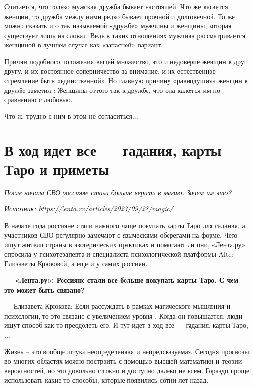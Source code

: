 Считается, что только мужская дружба бывает настоящей. Что же касается женщин, то дружба между ними редко бывает прочной и долговечной. То же можно сказать и о так называемой «дружбе» мужчины и женщины, которая существует лишь на словах. Ведь в таких отношениях мужчина рассматривается женщиной в лучшем случае как «запасной» вариант.

Причин подобного положения вещей множество, это и недоверие женщин к друг другу, и их постоянное соперничество за внимание, и их естественное стремление быть «единственной». Но главную причину «равнодушия» женщин к дружбе заметил : Женщины оттого так  к дружбе, что она кажется им  по сравнению с любовью.

Что ж, трудно с ним в этом не согласиться...

\newpage
\section{В ход идет все — гадания, карты Таро и приметы}

\textit{После начала СВО россияне стали больше верить в магию. Зачем им это?}

\textit{Источник: \url{https://lenta.ru/articles/2023/09/28/magia/}}

В начале года россияне стали намного чаще покупать карты Таро для гадания, а участников СВО регулярно замечают с языческими оберегами на форме. Чего ищут жители страны в эзотерических практиках и помогают ли они, «Лента.ру» спросила у психотерапевта и специалиста психологической платформы Alter Елизаветы Крюковой, а еще и у самих россиян.

\textbf{--- «Лента.ру»: Россияне стали все больше покупать карты Таро. С чем это может быть связано?}

--- Елизавета Крюкова: Если рассуждать в рамках магического мышления и психологии, то это связано с увеличением уровня . Когда он повышается, люди ищут способ как-то преодолеть его. И тут идет в ход все — гадания, карты Таро, ...

Жизнь -- это вообще штука неопределенная и непредсказуемая. Сегодня прогнозы во многих областях можно построить с помощью высшей математики и теории вероятностей, но это довольно сложно и доступно далеко не всем. Гораздо проще использовать какие-то  способы, которые появились сотни лет назад.


